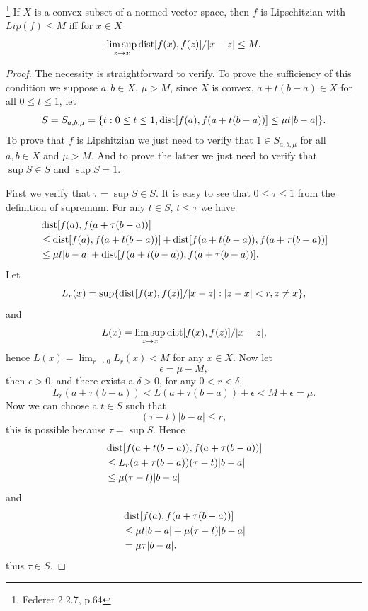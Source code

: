 \begin{lemma}
\footnote{Federer 2.2.7, p.64}
If $X$ is a convex subset of a normed vector space, then $f$ is Lipschitzian 
with $Lip(f)\leq M$ iff for $x\in X$
\[
  \limsup_{z\to x} \operatorname*{dist}[f(x),f(z)]/|x-z| \leq M.
\]
\end{lemma}
\begin{proof}
The necessity is straightforward to verify.
To prove the sufficiency of this condition we suppose $a,b\in X$, $\mu>M$, since
$X$ is convex, $a+t(b-a)\in X$ for all $0\leq t\leq 1$, let
\[
  S=S_{a,b,\mu}=\{ t: 0\leq t\leq 1, \operatorname*{dist}[f(a),f(a+t(b-a))]\leq \mu t|b-a| \}.
\]
To prove that $f$ is Lipshitzian we just need to verify that $1\in S_{a,b,\mu}$
for all $a,b\in X$ and $\mu>M$. And to prove the latter we just need to verify
that $\sup S\in S$ and $\sup S=1$.

First we verify that $\tau=\sup S\in S$. It is easy to see that 
$0\leq\tau\leq 1$ from the definition of supremum. For any $t\in S$, 
$t\leq \tau$ we have
\begin{align*}
  &\operatorname*{dist}[f(a),f(a+\tau (b-a))]  \\ \notag
  &\leq \operatorname*{dist}[f(a),f(a+t(b-a))] + \operatorname*{dist}[f(a+t(b-a)),f(a+\tau (b-a))] \\ \notag
  &\leq \mu t |b-a| + \operatorname*{dist}[f(a+t(b-a)),f(a+\tau (b-a))] \notag.
\end{align*}
Let 
\[
  L_r(x) = \sup\{ \operatorname*{dist}[f(x),f(z)]/|x-z| : |z-x|<r, z\neq x \},
\]
and
\[
  L(x) = \limsup_{z\to x} \operatorname*{dist}[f(x),f(z)]/|x-z|,
\]
hence $L(x)=\lim_{r\to 0} L_r(x) < M$ for any $x\in X$.
Now let
\[
  \epsilon = \mu - M,
\]
then $\epsilon>0$, and there exists a $\delta>0$, for any $0<r<\delta$, 
\[
  L_r(a+\tau (b-a)) < L(a+\tau (b-a)) + \epsilon < M + \epsilon = \mu.
\]
Now we can choose a $t\in S$ such that 
\[
  (\tau-t)|b-a| \leq r,
\]
this is possible because $\tau=\sup S$. Hence
\begin{align*}
  & \operatorname*{dist}[f(a+t(b-a)),f(a+\tau (b-a))]  \notag \\
  &\leq L_r(a+\tau (b-a)) (\tau - t) |b-a|  \notag \\
  &\leq \mu (\tau-t) |b-a|  \notag
\end{align*}
and
\begin{align*}
  &\operatorname*{dist}[f(a),f(a+\tau (b-a))]  \\ \notag
  &\leq \mu t |b-a| + \mu (\tau -t)|b-a| \\ \notag
  &= \mu \tau |b-a|.  \notag
\end{align*}
thus $\tau\in S$.


\end{proof}
